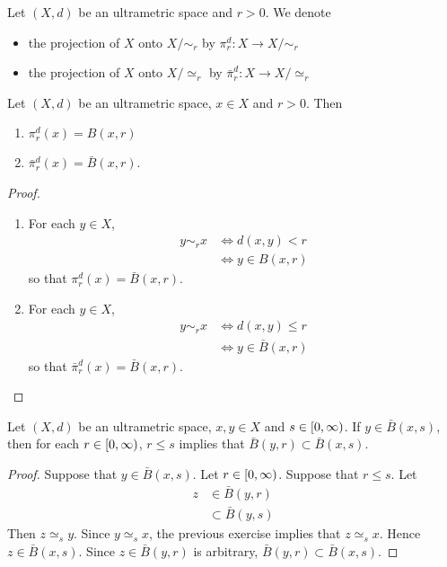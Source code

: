 \documentclass{book}
\begin{document}
\begin{defn}
	Let $(X, d)$ be an ultrametric space and $r > 0$. We denote
	\begin{itemize}
		\item the projection of $X$ onto $X/ \sim_r$ by $\pi^d_r: X \rightarrow X/ \sim_r$
		\item the projection of $X$ onto $X/ \simeq_r$ by $\bar{\pi}^d_r: X \rightarrow X/ \simeq_r$
	\end{itemize}
\end{defn}

\begin{ex}
	Let $(X, d)$ be an ultrametric space, $x \in X$ and $r >0$. Then 
	\begin{enumerate}
		\item $\pi^d_r(x) = B(x, r)$
		\item $\bar{\pi}^d_r(x) = \bar{B}(x, r)$.
	\end{enumerate} 
\end{ex}

\begin{proof} \
	\begin{enumerate}
		\item For each $y \in X$,
		\begin{align*}
			y \sim_r x
			& \iff d(x,y) < r \\
			& \iff y \in B(x, r)
		\end{align*}
		so that $\pi^d_r(x) = \bar{B}(x,r)$.
		\item For each $y \in X$,
		\begin{align*}
			y \sim_r x
			& \iff d(x,y) \leq r \\
			& \iff y \in \bar{B}(x, r)
		\end{align*}
		so that $\bar{\pi}^d_r(x) = \bar{B}(x,r)$.
	\end{enumerate}
\end{proof}

\begin{ex}
	Let $(X, d)$ be an ultrametric space, $x,y \in X$ and $s \in [0,\infty)$. If $y \in \bar{B}(x, s)$, then for each $r \in [0,\infty)$, $r \leq s$ implies that $\bar{B}(y, r) \subset \bar{B}(x, s)$. 
\end{ex}

\begin{proof}
	Suppose that $y \in \bar{B}(x, s)$. Let $r \in [0,\infty)$. Suppose that $r \leq s$. Let  
	\begin{align*}
		z 
		& \in \bar{B}(y, r) \\
		& \subset \bar{B}(y, s)
	\end{align*}
	Then $z \simeq_s y$. Since $y \simeq_s x$, the previous exercise implies that $z \simeq_s x$. Hence $z \in \bar{B}(x, s)$. Since $z \in \bar{B}(y, r)$ is arbitrary, $\bar{B}(y, r) \subset \bar{B}(x, s)$. 
\end{proof}
\end{document}
